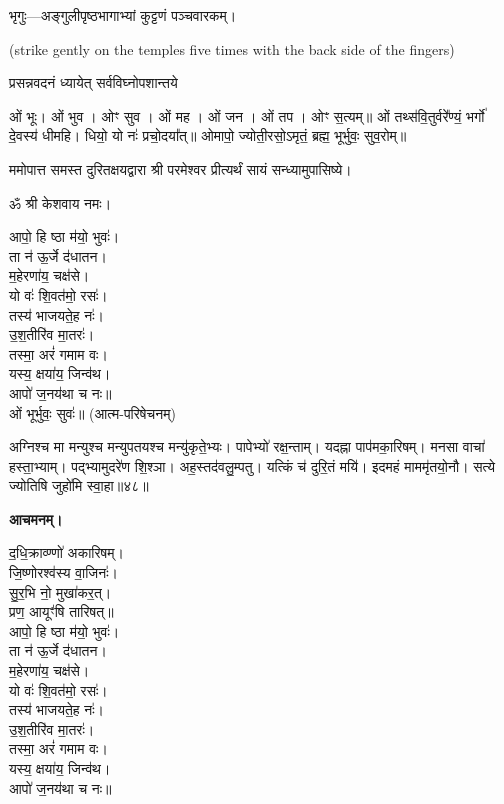 
भृगुः—अङ्गुलीपृष्ठभागाभ्यां कुट्टणं पञ्चवारकम्।

{\scriptsize (strike gently on the temples five times with the back side of the fingers)}

{प्रसन्नवदनं ध्यायेत् सर्वविघ्नोपशान्तये}


ओं भूः। ओं भुव। ओꣳ सुव। ओं मह। ओं जन। ओं तप। ओꣳ स॒त्यम्॥
ओं तथ्स॑वि॒तुर्वरे᳚ण्यं॒ भर्गो॑ दे॒वस्य॑ धीमहि। धियो॒ यो नः॑ प्रचो॒दया᳚त्॥
ओमापो॒ ज्योती॒रसो॒ऽमृतं॒ ब्रह्म॒ भूर्भुवः॒ सुव॒रोम्॥


ममोपात्त समस्त दुरितक्षयद्वारा श्री परमेश्वर प्रीत्यर्थं सायं सन्ध्यामुपासिष्ये।


ॐ श्री केशवाय नमः।

आपो॒ हि ष्ठा म॑यो॒ भुवः॑।\\
ता न॑ ऊ॒र्जे द॑धातन।\\
म॒हेरणा॑य॒ चक्ष॑से।\\
यो वः॑ शि॒वत॑मो॒ रसः॑।\\
तस्य॑ भाजयते॒ह नः॑।\\
उ॒श॒तीरि॑व मा॒तरः॑।\\
तस्मा॒ अरं॑ गमाम वः।\\
यस्य॒ क्षया॑य॒ जिन्व॑थ।\\
आपो॑ ज॒नय॑था च नः॥\\

ओं भूर्भुवः॒ सुवः॑॥ (आत्म-परिषेचनम्)


अग्निश्च मा मन्युश्च मन्युपतयश्च मन्यु॑कृते॒भ्यः। पापेभ्यो॑ रक्ष॒न्ताम्। यदह्ना पाप॑मका॒रिषम्। मनसा वाचा॑ हस्ता॒भ्याम्। पद्भ्यामुदरे॑ण शि॒श्ञा। अह॒स्तद॑वलु॒म्पतु। यत्किं च॑ दुरि॒तं मयि॑। इदमहं माममृ॑तयो॒नौ। सत्ये ज्योतिषि जुहो॑मि स्वा॒हा॥४८॥


\textbf{आचमनम्।}

द॒धि॒क्राव्ण्णो॑ अकारिषम्।\\
 जि॒ष्णोरश्व॑स्य वा॒जिनः॑।\\
सु॒र॒भि नो॒ मुखा॑कर॒त्।\\
प्रण॒ आयूꣳ॑षि तारिषत्॥\\



आपो॒ हि ष्ठा म॑यो॒ भुवः॑।\\
ता न॑ ऊ॒र्जे द॑धातन।\\
म॒हेरणा॑य॒ चक्ष॑से।\\
यो वः॑ शि॒वत॑मो॒ रसः॑।\\
तस्य॑ भाजयते॒ह नः॑।\\
उ॒श॒तीरि॑व मा॒तरः॑।\\
तस्मा॒ अरं॑ गमाम वः।\\
यस्य॒ क्षया॑य॒ जिन्व॑थ।\\
आपो॑ ज॒नय॑था च नः॥\\

